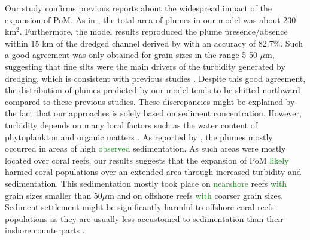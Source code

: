 \documentclass[preprint,12pt,authoryear]{elsarticle}
\newcommand{\modif}[1]{\textcolor{green}{#1}}
\begin{document}
Our study confirms previous reports about the widespread impact of the expansion of PoM. As in \cite{barnes2015sediment}, the total area of plumes in our model was about 230 km$^2$. Furthermore, the model results reproduced the plume presence/absence within 15 km of the dredged channel derived by \cite{cunning2019extensive} with an accuracy of 82.7\%. Such a good agreement was only obtained for grain sizes in the range 5-50 $\mu$m, suggesting that fine silts were the main drivers of the turbidity generated by dredging, which is consistent with previous studies \citep{storlazzi2015influence,fourney2017additive}. Despite this good agreement, the distribution of plumes predicted by our model tends to be shifted northward compared to these previous studies. These discrepancies might be explained by the fact that our approaches is solely based on sediment concentration. However, turbidity depends on many local factors such as the water content of phytoplankton and organic matters \citep{gray2000comparability,thackston2000improved}. As reported by \cite{cunning2019extensive}, the plumes mostly occurred in areas of high \modif{observed} sedimentation. As such areas were mostly located over coral reefs, our results suggests that the expansion of PoM \modif{likely} harmed coral populations over an extended area through increased turbidity and sedimentation. This sedimentation mostly took place on \modif{nearshore} reefs \modif{with} grain sizes smaller than 50$\mu$m and on offshore reefs \modif{with} coarser grain sizes. Sediment settlement might be significantly harmful to offshore coral reefs populations as they are usually less accustomed to sedimentation than their inshore  counterparts \citep{wolanski2005fine}.
\end{document}
